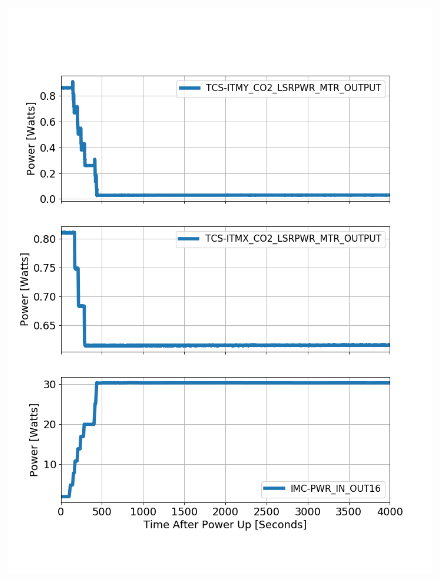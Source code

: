 \begin{figure}[ht]
	\centering
	\includegraphics[width=0.35\textheight]{../Figures/1231726400TCS_and_PSL_powerup.png}

\end{figure}
